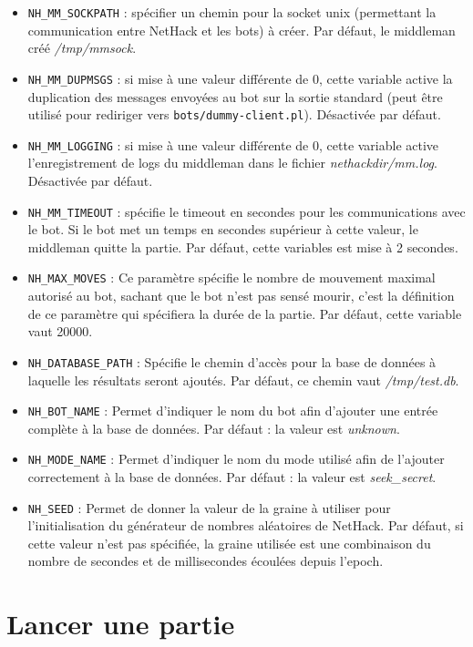 \documentclass[10pt,a4paper]{report}
\begin{document}
\begin{itemize}
\item \verb!NH_MM_SOCKPATH! : spécifier un chemin pour la socket unix (permettant la communication entre NetHack et les bots) à créer. Par défaut, le middleman créé \emph{/tmp/mmsock}.
\item \verb!NH_MM_DUPMSGS! : si mise à une valeur différente de 0, cette
	variable active la duplication des messages envoyées au bot sur la sortie
	standard (peut être utilisé pour rediriger vers \verb!bots/dummy-client.pl!).
	Désactivée par défaut.
\item \verb!NH_MM_LOGGING! : si mise à une valeur différente de 0, cette variable active l'enregistrement de logs du middleman dans le fichier \emph{nethackdir/mm.log}. Désactivée par défaut.
\item \verb!NH_MM_TIMEOUT! : spécifie le timeout en secondes pour les communications avec le bot. Si le bot met un temps en secondes supérieur à cette valeur, le middleman quitte la partie. Par défaut, cette variables est mise à 2 secondes.
\item \verb!NH_MAX_MOVES! :
  Ce paramètre spécifie le nombre de mouvement maximal autorisé au bot, sachant
  que le bot n'est pas sensé mourir, c'est la définition de ce paramètre qui
  spécifiera la durée de la partie. Par défaut, cette variable vaut 20000.
\item \verb!NH_DATABASE_PATH! :
  Spécifie le chemin d'accès pour la base de données à laquelle les résultats
  seront ajoutés. Par défaut, ce chemin vaut \emph{/tmp/test.db}.
\item \verb!NH_BOT_NAME! :
  Permet d'indiquer le nom du bot afin d'ajouter une entrée complète à la base
  de données. Par défaut : la valeur est \emph{unknown}.
\item \verb!NH_MODE_NAME! :
  Permet d'indiquer le nom du mode utilisé afin de l'ajouter correctement à la
  base de données. Par défaut : la valeur est \emph{seek\_secret}.
\item \verb!NH_SEED! :
  Permet de donner la valeur de la graine à utiliser pour l'initialisation du
  générateur de nombres aléatoires de NetHack. Par défaut, si cette
  valeur n'est pas spécifiée, la graine utilisée est une combinaison du nombre
  de secondes et de millisecondes écoulées depuis l'epoch.
\end{itemize}

\section{Lancer une partie}
\end{document}
